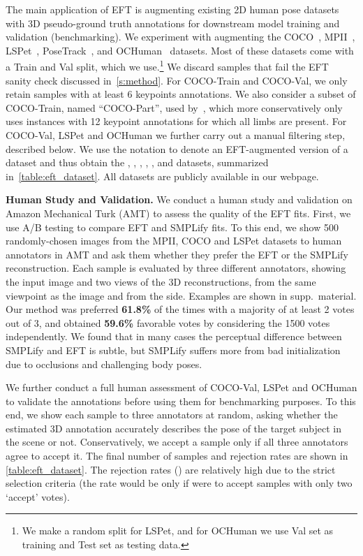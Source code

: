\documentclass[10pt,twocolumn,letterpaper]{article}
\begin{document}
	The main application of EFT is augmenting existing 2D human pose datasets with 3D pseudo-ground truth annotations for downstream model training and validation (benchmarking).
	We experiment with augmenting the COCO~\cite{lin2014microsoft}, MPII~\cite{Andriluka-14}, LSPet~\cite{Johnson11}, PoseTrack~\cite{PoseTrack}, and OCHuman~\cite{pose2seg2019} datasets.
	Most of these datasets come with a Train and Val split, which we use.\footnote{We make a random split for LSPet, and for OCHuman we use Val set as training and Test set as testing data.}
	We discard samples that fail the EFT sanity check discussed in~\cref{s:method}.
	For COCO-Train and COCO-Val, we only retain samples with at least 6 keypoints annotations.
	We also consider a subset of COCO-Train, named ``COCO-Part'', used by~\cite{kolotouros19convolutional}, which more conservatively only uses instances with 12 keypoint annotations for which all limbs are present.
	For COCO-Val, LSPet and OCHuman we further carry out a manual filtering step, described below.
	We use the notation  to denote an EFT-augmented version of a dataset and thus obtain the , , , , , and  datasets, summarized in~\cref{table:eft_dataset}.
	All datasets are publicly available in our webpage.
	
\noindent \textbf{Human Study and Validation.}
We conduct a human study and validation on Amazon Mechanical Turk (AMT) to assess the quality of the EFT fits.
	First, we use A/B testing to compare EFT and SMPLify fits.
	To this end, we show 500 randomly-chosen images from the MPII, COCO and LSPet datasets to human annotators in AMT and ask them whether they prefer the EFT or the SMPLify reconstruction.
	Each sample is evaluated by three different annotators, showing the input image and two views of the 3D reconstructions, from the same viewpoint as the image and from the side.
	Examples are shown in supp.~material. Our method was preferred \textbf{61.8\%} of the times with a majority of at least 2 votes out of 3, and obtained \textbf{59.6\%} favorable votes by considering the 1500 votes independently.
	We found that in many cases the perceptual difference between SMPLify and EFT is subtle, but SMPLify suffers more from bad initialization due to occlusions and challenging body poses.
	
	We further conduct a full human assessment of COCO-Val, LSPet and OCHuman to validate the annotations before using them for benchmarking purposes.
	To this end, we show each sample to three annotators at random, asking whether the estimated 3D annotation accurately describes the pose of the target subject in the scene or not.
	Conservatively, we accept a sample only if all three annotators agree to accept it.
	The final number of samples and rejection rates are shown in \cref{table:eft_dataset}.
	The rejection rates () are relatively high due to the strict selection criteria (the rate would be only  if were to accept samples with only two `accept' votes).
	
\end{document}
